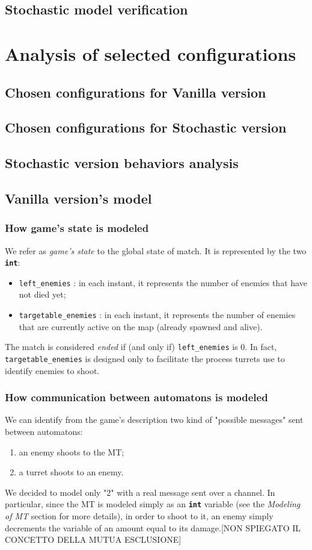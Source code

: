 \documentclass[
10pt, %
a4paper, %
oneside, %
headinclude,footinclude, %
BCOR5mm, %
]{scrartcl}
\begin{document}
		\subsection{Stochastic model verification}
	\section{Analysis of selected configurations}
		\subsection{Chosen configurations for Vanilla version}
		\subsection{Chosen configurations for Stochastic version}
		\subsection{Stochastic version behaviors analysis}
		
	\subsection{Vanilla version's model}
	\subsubsection{How game's state is modeled}
	We refer as \emph{game's state} to the global state of match. It is represented by the two \texttt{\textbf{int}}:
	\begin{itemize}
		\item \texttt{left\_enemies} : in each instant, it represents the number of enemies that have not died yet;
		\item \texttt{targetable\_enemies} : in each instant, it represents the number of enemies that are currently active on the map (already spawned and alive).
	\end{itemize}
	The match is considered \emph{ended} if (and only if) \texttt{left\_enemies} is 0. In fact, \texttt{targetable\_enemies} is designed only to facilitate the process turrets use to identify enemies to shoot.
	
	\subsubsection{How communication between automatons is modeled}
	We can identify from the game's description two kind of "possible messages" sent between automatons:
	\begin{enumerate}
		\item an enemy shoots to the MT;
		\item a turret shoots to an enemy.
	\end{enumerate}
	We decided to model only "2" with a real message sent over a channel. In particular, since the MT is modeled simply as an \texttt{\textbf{int}} variable (see the \emph{Modeling of MT} section for more details), in order to shoot to it, an enemy simply decrements the variable of an amount equal to its damage.[NON SPIEGATO IL CONCETTO DELLA MUTUA ESCLUSIONE]
	
\end{document}
